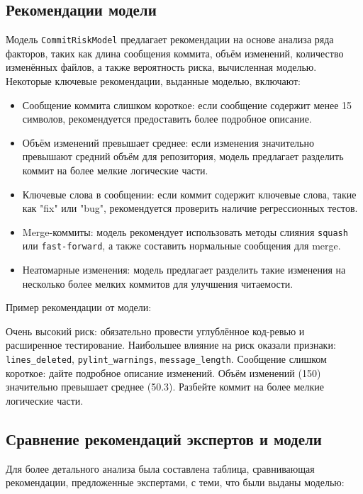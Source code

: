 \begin{itemize}
\subsection{Рекомендации модели}

Модель \texttt{CommitRiskModel} предлагает рекомендации на основе анализа ряда факторов, таких как длина сообщения коммита, объём изменений, количество изменённых файлов, а также вероятность риска, вычисленная моделью. Некоторые ключевые рекомендации, выданные моделью, включают:

\begin{itemize}
	\item Сообщение коммита слишком короткое: если сообщение содержит менее 15 символов, рекомендуется предоставить более подробное описание.
	\item Объём изменений превышает среднее: если изменения значительно превышают средний объём для репозитория, модель предлагает разделить коммит на более мелкие логические части.
	\item Ключевые слова в сообщении: если коммит содержит ключевые слова, такие как "fix" или "bug", рекомендуется проверить наличие регрессионных тестов.
	\item Merge-коммиты: модель рекомендует использовать методы слияния \texttt{squash} или \texttt{fast-forward}, а также составить нормальные сообщения для merge.
	\item Неатомарные изменения: модель предлагает разделить такие изменения на несколько более мелких коммитов для улучшения читаемости.
\end{itemize}

Пример рекомендации от модели:

Очень высокий риск: обязательно провести углублённое код-ревью и расширенное тестирование. Наибольшее влияние на риск оказали признаки: \verb|lines_deleted|, \verb|pylint_warnings|, \verb|message_length|. Сообщение слишком короткое: дайте подробное описание изменений. Объём изменений (150) значительно превышает среднее (50.3). Разбейте коммит на более мелкие логические части.

\subsection{Сравнение рекомендаций экспертов и модели}

Для более детального анализа была составлена таблица, сравнивающая рекомендации, предложенные экспертами, с теми, что были выданы моделью:


\end{itemize}
